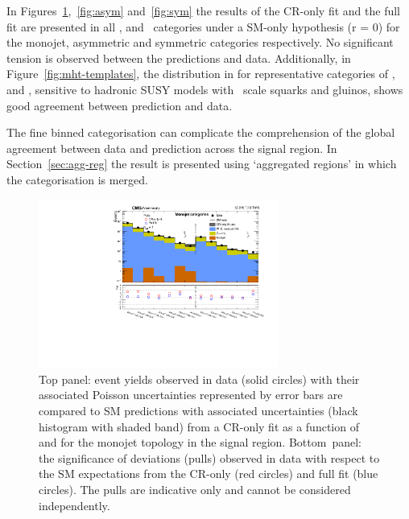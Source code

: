 In Figures~\ref{fig:mono},~\ref{fig:asym} and~\ref{fig:sym} the results of the CR-only fit and the full fit are presented in all \scalht, \njet 
and \nb~categories under a SM-only hypothesis (r = 0) for the monojet, asymmetric 
and symmetric categories respectively. No significant tension is observed between the predictions
and data. Additionally, in Figure~\ref{fig:mht-templates}, the distribution in \mht for representative 
categories of \scalht, \njet and \nb, sensitive to hadronic SUSY models with \TeV~scale squarks and gluinos, 
shows good agreement between prediction and data.

The fine binned categorisation can complicate the comprehension of the global agreement between data and 
prediction across the signal region. In Section~\ref{sec:agg-reg} the result is presented using 
`aggregated regions' in which the categorisation is merged. 

\begin{figure}[!h]
  \begin{center}
    \includegraphics[width=0.7\textwidth]{Figures/statisticalResults/summaryPlot_Monojet_prefit_overlay_fit_b}
    \caption{Top panel: event yields observed in data (solid circles) 
	with their associated Poisson uncertainties represented by error bars 
	are compared to SM predictions with associated uncertainties (black
      histogram with shaded band) from a CR-only fit as a function of
      \nb~ and \scalht for the monojet topology in the
      signal region. Bottom~panel: the significance of deviations
      (pulls) observed in data with respect to the SM expectations
      from the CR-only (red circles) and full fit (blue circles). The
      pulls are indicative only and cannot be considered
      independently.}
    \label{fig:mono}
  \end{center}
\end{figure}

